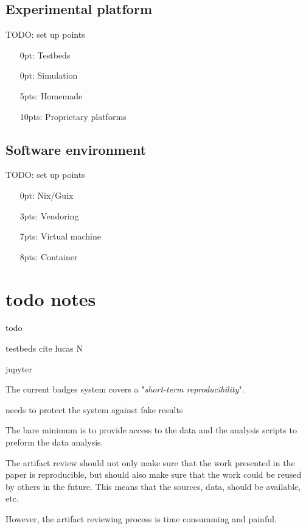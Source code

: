 \documentclass[sigconf,natbib=false]{acmart}
\newcommand{\todo}[1]{{\color{red}TODO: #1}}
\begin{document}
\subsection{Experimental platform}

\todo{set up points}

\begin{itemize}
  \item[0pt:] Testbeds
  \item[0pt:] Simulation
  \item[5pts:] Homemade
  \item[10pts:] Proprietary platforms
\end{itemize}

\subsection{Software environment}

\todo{set up points}

\begin{itemize}
  \item[0pt:] Nix/Guix
  \item[3pts:] Vendoring
  \item[7pts:] Virtual machine
  \item[8pts:] Container
\end{itemize}



\section{todo notes}

todo

testbeds cite lucas N

jupyter 

The current badges system covers a "\emph{short-term reproducibility}".

needs to protect the system against fake results 

The bare minimum is to provide access to the data and the analysis scripts to preform the data analysis.

The artifact review should not only make sure that the work presented in the paper is reproducible, but should also make sure that the work could be reused by others in the future.
This means that the sources, data, should be available, etc.

However, the artifact reviewing process is time consumming and painful.
\end{document}
